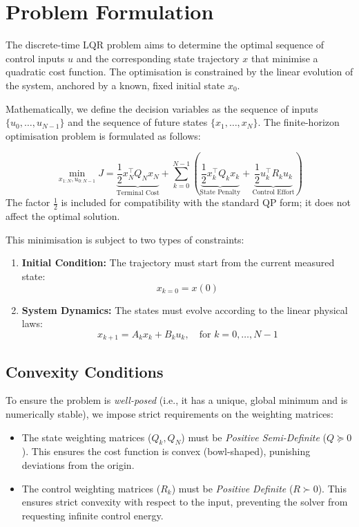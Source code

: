 \section{Problem Formulation}

The discrete-time LQR problem aims to determine the optimal sequence of control inputs $u$ and the corresponding state trajectory $x$ that minimise a quadratic cost function. The optimisation is constrained by the linear evolution of the system, anchored by a known, fixed initial state $x_0$.

Mathematically, we define the decision variables as the sequence of inputs $\{u_0, \dots, u_{N-1}\}$ and the sequence of future states $\{x_1, \dots, x_N\}$. The finite-horizon optimisation problem is formulated as follows:

\begin{equation*}
	\min_{x_{1:N}, u_{0:N-1}} J = \underbrace{\frac{1}{2} x_N^\top Q_N x_N}_{\text{Terminal Cost}} + \sum_{k=0}^{N-1} \left( \underbrace{\frac{1}{2} x_k^\top Q_k x_k}_{\text{State Penalty}} + \underbrace{\frac{1}{2} u_k^\top R_k u_k}_{\text{Control Effort}} \right)
\end{equation*}
The factor $\tfrac{1}{2}$ is included for compatibility with the standard QP form; it does not affect the optimal solution.

This minimisation is subject to two types of constraints:
\begin{enumerate}
	\item \textbf{Initial Condition:} The trajectory must start from the current measured state:
	\begin{equation*}
		x_{k=0} = x(0)
	\end{equation*}
	\item \textbf{System Dynamics:} The states must evolve according to the linear physical laws:
	\begin{equation*}
		x_{k+1} = A_k x_k + B_k u_k, \quad \text{for } k = 0, \dots, N-1
	\end{equation*}
\end{enumerate}

\subsection*{Convexity Conditions}
To ensure the problem is \emph{well-posed} (i.e., it has a unique, global minimum and is numerically stable), we impose strict requirements on the weighting matrices:
\begin{itemize}
	\item The state weighting matrices ($Q_k, Q_N$) must be \emph{Positive Semi-Definite} ($Q \succeq 0$). This ensures the cost function is convex (bowl-shaped), punishing deviations from the origin.
	\item The control weighting matrices ($R_k$) must be \emph{Positive Definite} ($R \succ 0$). This ensures strict convexity with respect to the input, preventing the solver from requesting infinite control energy.
\end{itemize}

